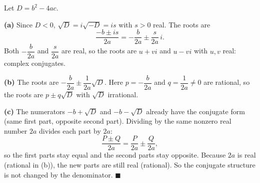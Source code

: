 Let $D=b^2-4ac$.

\textbf{(a)} Since $D<0$, $\sqrt D=i\sqrt{-D}=is$ with $s>0$ real. The roots are
\[\dfrac{-b\pm is}{2a}=-\dfrac{b}{2a}\pm\dfrac{s}{2a}\,i.\]
Both $-\dfrac b{2a}$ and $\dfrac s{2a}$ are real, so the roots are $u+vi$ and $u-vi$ with $u,v$ real: complex conjugates.

\textbf{(b)} The roots are $-\dfrac b{2a}\pm\dfrac1{2a}\sqrt D$. Here $p=-\dfrac b{2a}$ and $q=\dfrac1{2a}\ne0$ are rational, so the roots are $p\pm q\sqrt D$ with $\sqrt D$ irrational.

\textbf{(c)} The numerators $-b+\sqrt D$ and $-b-\sqrt D$ already have the conjugate form (same first part, opposite second part). Dividing by the same nonzero real number $2a$ divides each part by $2a$:
\[\dfrac{P\pm Q}{2a}=\dfrac P{2a}\pm\dfrac Q{2a},\]
so the first parts stay equal and the second parts stay opposite. Because $2a$ is real (rational in (b)), the new parts are still real (rational). So the conjugate structure is not changed by the denominator. $\blacksquare$
